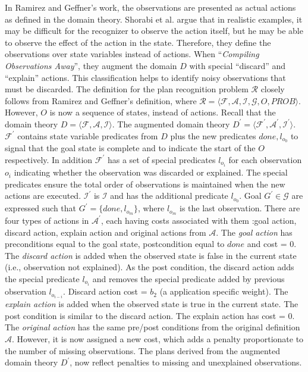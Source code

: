 In Ramirez and Geffner's work, the observations are presented as actual actions as defined in the domain theory. Shorabi et al. argue that in realistic examples, it may be difficult for the recognizer to observe the action itself, but he may be able to observe the effect of the action in the state. Therefore, they define the observations over state variables instead of actions. When  ``\textit{Compiling Observations Away}'', they augment the domain $D$ with special ``discard'' and ``explain'' actions. This classification helps to identify noisy observations that must be discarded. The definition for the plan recognition problem $\mathcal{R}$ closely follows from Ramirez and Geffner's definition, where $\mathcal{R}=\langle \mathcal{F}, \mathcal{A}, \mathcal{I}, \mathcal{G}, O, PROB\rangle$. However, $O$ is now a sequence of states, instead of actions. Recall that the domain theory $D=\langle \mathcal{F}, \mathcal{A}, \mathcal{I}\rangle$. The augmented domain theory $D^\prime=\langle \mathcal{F}^\prime, \mathcal{A}^\prime, \mathcal{I}^\prime\rangle$. $\mathcal{F}^\prime$ contains state variable predicates from $D$ plus the new predicates  $done, l_{o_0}$ to signal that the goal state is complete and to indicate the start of the $O$ respectively. In addition  $\mathcal{F}^\prime$ has a set of special predicates $l_{o_i}$ for each observation $o_i$ indicating whether the observation was discarded or explained. The special predicates ensure the total order of observations is maintained when the new actions are executed. $\mathcal{I}^\prime$ is $\mathcal{I}$ and has the additional predicate $l_{o_0}$. Goal $G^\prime \in \mathcal{G}$ are expressed such that $G^\prime = \lbrace done, l_{o_m}\rbrace$, where $l_{o_m}$ is the last observation. There are four types of actions in $\mathcal{A^\prime}$, each having costs associated with them :goal action, discard action, explain action and original actions from $\mathcal{A}$. The \textit{goal action} has preconditions equal to the goal state, postcondition equal to $done$ and cost = 0. The \textit{discard action} is added when the observed state is false in the current state (i.e., observation not explained). As the post condition, the discard action adds the special predicate $l_{o_i}$ and removes the special predicate added by previous observation $l_{o_{i-i}}$. Discard action cost = $b_2$ (a application specific weight). The \textit{explain action} is added when the observed state is true in the current state. The post condition is similar to the discard action. The explain action has cost = 0. The \textit{original action} has the same pre/post conditions from the original definition $\mathcal{A}$. However, it is now assigned a new cost, which adds a penalty proportionate to the number of missing observations. The plans derived from the augmented domain theory $D^\prime$, now reflect penalties to missing and unexplained observations.

